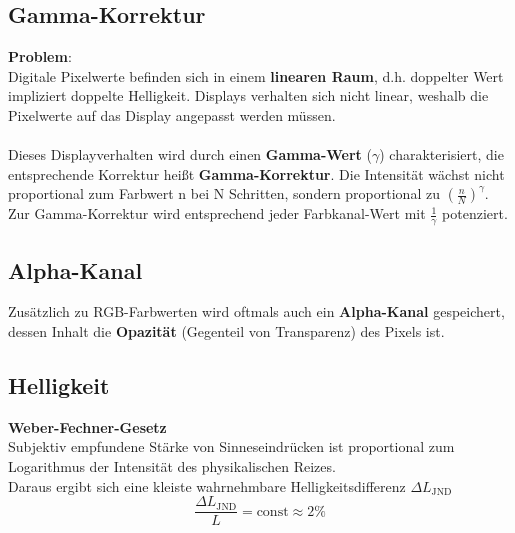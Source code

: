 \documentclass[10pt,a4paper]{article}
\begin{document}
	\subsection{Gamma-Korrektur}
	\label{bfp:sub:gamma_korrektur}

	\textbf{Problem}:\\
	Digitale Pixelwerte befinden sich in einem \textbf{linearen Raum}, d.h. doppelter Wert impliziert doppelte Helligkeit. Displays verhalten sich nicht linear, weshalb die Pixelwerte auf das Display angepasst werden müssen.
	\\\\
	Dieses Displayverhalten wird durch einen \textbf{Gamma-Wert} ($\gamma$) charakterisiert, die entsprechende Korrektur heißt \textbf{Gamma-Korrektur}. Die Intensität wächst nicht proportional zum Farbwert n bei N Schritten, sondern proportional zu $(\frac{n}{N})^{\gamma}$. Zur Gamma-Korrektur wird entsprechend jeder Farbkanal-Wert mit $\frac{1}{\gamma}$ potenziert.

	\subsection{Alpha-Kanal}
	\label{bfp:sub:alpha_kanal}
	
	Zusätzlich zu RGB-Farbwerten wird oftmals auch ein \textbf{Alpha-Kanal} gespeichert, dessen Inhalt die \textbf{Opazität} (Gegenteil von Transparenz) des Pixels ist.

	\newpage
    \subsection{Helligkeit}
    \label{bfp:sub:helligkeit}
    
    \textbf{Weber-Fechner-Gesetz}\\
    Subjektiv empfundene Stärke von Sinneseindrücken ist proportional zum Logarithmus der Intensität des
    physikalischen Reizes.\\

    Daraus ergibt sich eine kleiste wahrnehmbare Helligkeitsdifferenz $\Delta L_\text{JND}$
    $$\frac{\Delta L_\text{JND}}{L} = \text{const} \approx 2\%$$
    \begin{figure}[!h]
    	\centering
    \end{figure}
\end{document}

